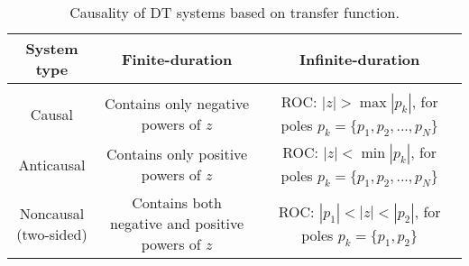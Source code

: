 \documentclass{report}
\begin{document}
\begin{table}[hbt!]
    \centering
    \caption{Causality of DT systems based on transfer function.}
    \label{causality}
    \begin{tabular}{|c|c|c|}
        \hline
        System type & Finite-duration & Infinite-duration \\[0.1cm]
        \hline
        & & \\
        Causal & \Centerstack{Contains only \\negative powers of $z$} & \Centerstack{ROC: $|z|>\max|p_k|$, \\for poles $p_k=\{p_1,p_2,...,p_N\}$} \\[0.5cm]
        Anticausal & \Centerstack{Contains only \\positive powers of $z$} & \Centerstack{ROC: $|z|<\min|p_k|$, \\for poles $p_k=\{p_1,p_2,...,p_N\}$} \\[0.5cm]
        \Centerstack{Noncausal\\(two-sided)} & \Centerstack{Contains both \\negative and \\positive powers of $z$} & \Centerstack{ROC: $|p_1|<|z|<|p_2|$, \\for poles $p_k=\{p_1,p_2\}$} \\[0.5cm]
        \hline
    \end{tabular}
\end{table}
\end{document}
